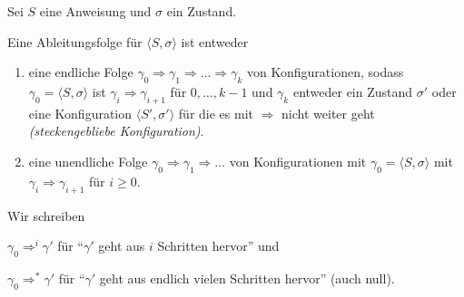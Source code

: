 \begin{definition}
    Sei $S$ eine Anweisung und $\sigma$ ein Zustand.

    Eine Ableitungsfolge für $\langle S, \sigma \rangle$ ist entweder
    \begin{enumerate}
        \item eine endliche Folge $\gamma_0 \Rightarrow \gamma_1 \Rightarrow \dots \Rightarrow \gamma_k$ von Konfigurationen, sodass $\gamma_0 = \langle S, \sigma \rangle$ ist $\gamma_i \Rightarrow \gamma_{i+1}$ für $0, \dots, k-1$ und $\gamma_k$ entweder ein Zustand $\sigma'$ oder eine Konfiguration $\langle S', \sigma' \rangle$ für die es mit $\Rightarrow$ nicht weiter geht \emph{(steckengebliebe Konfiguration)}.

        \item eine unendliche Folge $\gamma_0 \Rightarrow \gamma_1 \Rightarrow \dots$ von Konfigurationen mit $\gamma_0 = \langle S, \sigma \rangle$ mit $\gamma_i \Rightarrow \gamma_{i+1}$ für $i \geq 0$.
    \end{enumerate}
\end{definition}

\par\medskip
\begin{notation}
    Wir schreiben

    $\gamma_0 \Rightarrow^i \gamma'$ für ``$\gamma'$ geht aus $i$ Schritten hervor'' und

    $\gamma_0 \Rightarrow^* \gamma'$ für ``$\gamma'$ geht aus endlich vielen Schritten hervor'' (auch null).
\end{notation}
